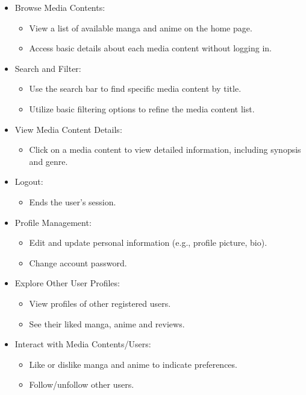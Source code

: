 \begin{itemize}
    \item Browse Media Contents:
    \begin{itemize}
        \item View a list of available manga and anime on the home page.
        \item Access basic details about each media content without logging in.
    \end{itemize}
    \item Search and Filter:
    \begin{itemize}
        \item Use the search bar to find specific media content by title.
        \item Utilize basic filtering options to refine the media content list.
    \end{itemize}
    \item View Media Content Details:
    \begin{itemize}
        \item Click on a media content to view detailed information, including synopsis and genre.
    \end{itemize}
    \item Logout:
    \begin{itemize}
        \item Ends the user's session.
    \end{itemize}
    \item Profile Management:
    \begin{itemize}
        \item Edit and update personal information (e.g., profile picture, bio).
        \item Change account password.
    \end{itemize}
    \item Explore Other User Profiles:
    \begin{itemize}
        \item View profiles of other registered users.
        \item See their liked manga, anime and reviews.
    \end{itemize}
    \item Interact with Media Contents/Users:
    \begin{itemize}
        \item Like or dislike manga and anime to indicate preferences.
        \item Follow/unfollow other users.

\end{itemize}
\end{itemize}
